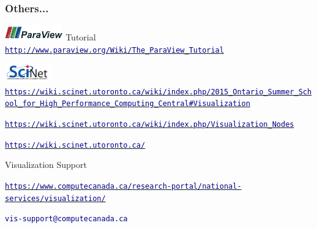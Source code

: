 \begin{frame}
\frametitle{Others...}
	\begin{beamerboxesrounded}[upper=block head,lower=block body,shadow=true]{ %
\href{http://www.paraview.org}{\includegraphics[width=2.5cm]{figs/visit-logos/ParaViewLogo}} Tutorial}
	 \href{http://www.paraview.org/Wiki/The_ParaView_Tutorial}{\textcolor{DarkBlue}{\small \tt http://www.paraview.org/Wiki/The\_ParaView\_Tutorial}}
	\end{beamerboxesrounded}

	\vspace{5mm}
	\begin{beamerboxesrounded}[upper=block head,lower=block body,shadow=true]{ \href{http://www.scinethpc.ca}{\includegraphics[width=2cm,clip=true,trim=0 0mm 0 0]{logos/SciNet_newLogo}}}
		{\small {}} \href{https://wiki.scinet.utoronto.ca/wiki/index.php/2015_Ontario_Summer_School_for_High_Performance_Computing_Central\#Visualization}{\textcolor{DarkBlue}{\tiny\tt https://wiki.scinet.utoronto.ca/wiki/index.php/2015\_Ontario\_Summer\_School\_for\_High\_Performance\_Computing\_Central\#Visualization}}

		{\small {}} \href{https://wiki.scinet.utoronto.ca/wiki/index.php/Visualization_Nodes}{\textcolor{DarkBlue}{\tiny\tt https://wiki.scinet.utoronto.ca/wiki/index.php/Visualization\_Nodes}}

		{\small{}} \href{https://wiki.scinet.utoronto.ca/}{\textcolor{DarkBlue}{\small\tt https://wiki.scinet.utoronto.ca/}}
	\end{beamerboxesrounded}



        \vspace{5mm}
        \begin{beamerboxesrounded}[upper=block head,lower=block body,shadow=true]{ Visualization Support}

		{\small{}} \href{https://www.computecanada.ca/research-portal/national-services/visualization/}{\textcolor{DarkBlue}{\tiny\tt https://www.computecanada.ca/research-portal/national-services/visualization/}}

		{\small{}} \textcolor{DarkBlue}{\small\tt vis-support@computecanada.ca}
        \end{beamerboxesrounded}


\end{frame}
